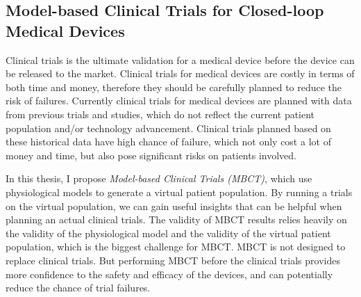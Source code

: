 \documentclass[a4paper]{article}
\begin{document}
\subsection{Model-based Clinical Trials for Closed-loop Medical Devices}
Clinical trials is the ultimate validation for a medical device before the device can be released to the market.
Clinical trials for medical devices are costly in terms of both time and money, therefore they should be carefully planned to reduce the risk of failures.
Currently clinical trials for medical devices are planned with data from previous trials and studies, which do not reflect the current patient population and/or technology advancement.
Clinical trials planned based on these historical data have high chance of failure, which not only cost a lot of money and time, but also pose significant risks on patients involved.

In this thesis, I propose \emph{Model-based Clinical Trials (MBCT)}, which use physiological models to generate a virtual patient population.
By running a trials on the virtual population, we can gain useful insights that can be helpful when planning an actual clinical trials.
The validity of MBCT results relies heavily on the validity of the physiological model and the validity of the virtual patient population, which is the biggest challenge for MBCT.
MBCT is not designed to replace clinical trials.
But performing MBCT before the clinical trials provides more confidence to the safety and efficacy of the devices, and can potentially reduce the chance of trial failures.
\end{document}
